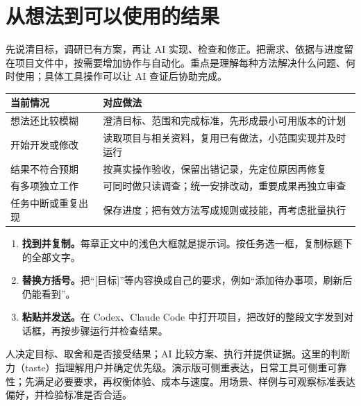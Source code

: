 \clearpage\section*{从想法到可以使用的结果}\label{guide}
先说清目标，调研已有方案，再让 AI 实现、检查和修正。把需求、依据与进度留在项目文件中，按需要增加协作与自动化。重点是理解每种方法解决什么问题、何时使用；具体工具操作可以让 AI 查证后协助完成。

\begin{tabularx}{\linewidth}{@{}L{35mm}Y@{}}
\toprule 当前情况 & 对应做法\\\midrule
想法还比较模糊 & 澄清目标、范围和完成标准，先形成最小可用版本的计划\\
开始开发或修改 & 读取项目与相关资料，复用已有做法，小范围实现并及时运行\\
结果不符合预期 & 按真实操作验收，保留出错记录，先定位原因再修复\\
有多项独立工作 & 可同时做只读调查；统一安排改动，重要成果再独立审查\\
任务中断或重复出现 & 保存进度；把有效方法写成规则或技能，再考虑批量执行\\
\bottomrule\end{tabularx}
\begin{enumerate}
\item \textbf{找到并复制。}每章正文中的浅色大框就是提示词。按任务选一框，复制标题下的全部文字。
\item \textbf{替换方括号。}把“[目标]”等内容换成自己的要求，例如“添加待办事项，刷新后仍能看到”。
\item \textbf{粘贴并发送。}在 Codex、Claude Code 中打开项目，把改好的整段文字发到对话框，再按步骤运行并检查结果。
\end{enumerate}
人决定目标、取舍和是否接受结果；AI 比较方案、执行并提供证据。这里的判断力（taste）指理解用户并确定优先级。演示版可侧重表达，日常工具可侧重可靠性；先满足必要要求，再权衡体验、成本与速度。用场景、样例与可观察标准表达偏好，并检验标准是否合适。
